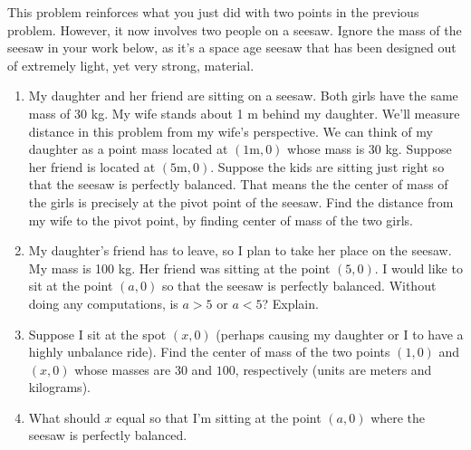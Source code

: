 \begin{problem}
 This problem reinforces what you just did with two points in the previous problem. However, it now involves two people on a seesaw. %
Ignore the mass of the seesaw in your work below, as it's a space age seesaw that has been designed out of extremely light, yet very strong, material. 
\begin{enumerate}
 \item 
 My daughter and her friend are sitting on a seesaw.  Both girls have the same mass of 30 kg. My wife stands about 1 m behind my daughter. We'll measure distance in this problem from my wife's perspective.  We can think of my daughter as a point mass located at $(1\text{m},0)$ whose mass is $30$ kg. Suppose her friend is located at $(5\text{m},0)$. Suppose the kids are sitting just right so that the seesaw is perfectly balanced.  That means the the center of mass of the girls is precisely at the pivot point of the seesaw. Find the distance from my wife to the pivot point, by finding center of mass of the two girls. 
 \item My daughter's friend has to leave, so I plan to take her place on the seesaw. My mass is 100 kg. Her friend was sitting at the point $(5,0)$. I would like to sit at the point $(a,0)$ so that the seesaw is perfectly balanced. Without doing any computations, is $a>5$ or $a<5$? Explain.
 \item Suppose I sit at the spot $(x,0)$ (perhaps causing my daughter or I to have a highly unbalance ride). Find the center of mass of the two points $(1,0)$ and $(x,0)$ whose masses are $30$ and $100$, respectively (units are meters and kilograms). 
 \item What should $x$ equal so that I'm sitting at the point $(a,0)$ where the seesaw is perfectly balanced. 
\end{enumerate}
\end{problem}



